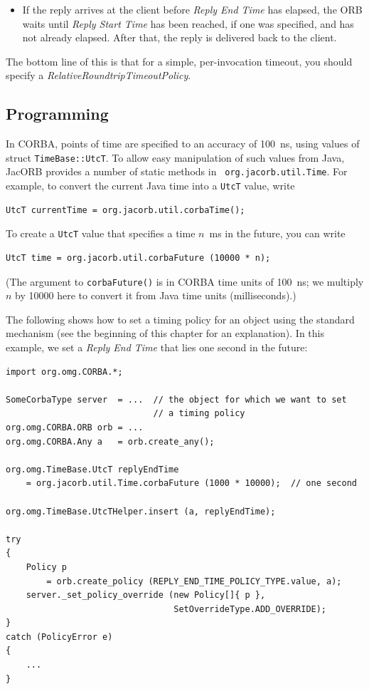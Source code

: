\begin{itemize}
\item If the reply arrives at the client before \emph{Reply End Time}
has elapsed, the ORB waits until \emph{Reply Start Time} has been
reached, if one was specified, and has not already elapsed.  After
that, the reply is delivered back to the client.

\end{itemize}

The bottom line of this is that for a simple, per-invocation timeout,
you should specify a \mbox{\emph{RelativeRoundtripTimeoutPolicy}}.

\subsection*{Programming}

In CORBA, points of time are specified to an accuracy of 100~ns, using
values of struct {\tt TimeBase::UtcT}.  To allow easy manipulation of such
values from Java, JacORB provides a number of static methods in {\tt
org.jacorb.util.Time}.  For example, to convert the current Java time
into a {\tt UtcT} value, write

\begin{verbatim}
UtcT currentTime = org.jacorb.util.corbaTime();
\end{verbatim}

To create a {\tt UtcT} value that specifies a time $n$~ms in the
future, you can write

\begin{verbatim}
UtcT time = org.jacorb.util.corbaFuture (10000 * n);
\end{verbatim}

(The argument to {\tt corbaFuture()} is in CORBA time units of
100~ns; we multiply $n$ by 10000 here to convert it from Java time
units (milliseconds).)

The following shows how to set a timing policy for an object using the
standard mechanism (see the beginning of this chapter for an
explanation).  In this example, we set a \emph{Reply End Time} that
lies one second in the future:

\begin{verbatim}
import org.omg.CORBA.*;

SomeCorbaType server  = ...  // the object for which we want to set
                             // a timing policy
org.omg.CORBA.ORB orb = ...
org.omg.CORBA.Any a   = orb.create_any();

org.omg.TimeBase.UtcT replyEndTime
    = org.jacorb.util.Time.corbaFuture (1000 * 10000);  // one second

org.omg.TimeBase.UtcTHelper.insert (a, replyEndTime);

try
{
    Policy p
        = orb.create_policy (REPLY_END_TIME_POLICY_TYPE.value, a);
    server._set_policy_override (new Policy[]{ p },
                                 SetOverrideType.ADD_OVERRIDE);
}
catch (PolicyError e)
{
    ...
}
\end{verbatim}

